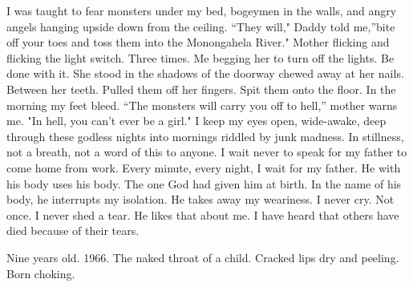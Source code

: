 \documentclass[
]{memoir}
\begin{document}
I was taught to fear monsters under my bed, bogeymen in the walls, and
angry angels hanging upside down from the ceiling. ``They will," Daddy
told me,''bite off your toes and toss them into the Monongahela River."
Mother flicking and flicking the light switch. Three times. Me begging
her to turn off the lights. Be done with it. She stood in the shadows of
the doorway chewed away at her nails. Between her teeth. Pulled them off
her fingers. Spit them onto the floor. In the morning my feet bleed.
``The monsters will carry you off to hell,'' mother warns me. "In hell,
you can't ever be a girl." I keep my eyes open, wide-awake, deep through
these godless nights into mornings riddled by junk madness. In
stillness, not a breath, not a word of this to anyone. I wait never to
speak for my father to come home from work. Every minute, every night, I
wait for my father. He with his body uses his body. The one God had
given him at birth. In the name of his body, he interrupts my isolation.
He takes away my weariness. I never cry. Not once. I never shed a tear.
He likes that about me. I have heard that others have died because of
their tears.

Nine years old. 1966. The naked throat of a child. Cracked lips dry and
peeling. Born choking.
\end{document}
